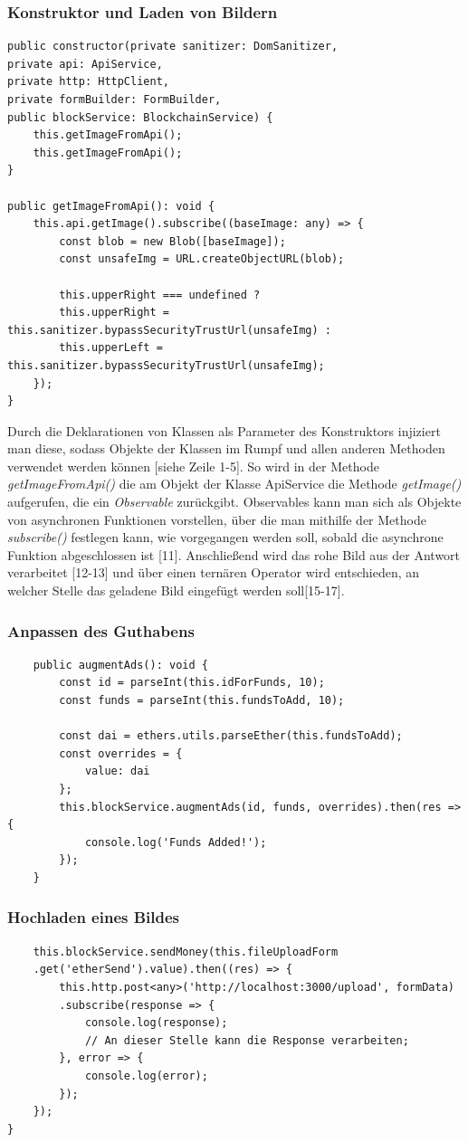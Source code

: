 \subsubsection{Konstruktor und Laden von Bildern}
\begin{lstlisting}
public constructor(private sanitizer: DomSanitizer,
private api: ApiService,
private http: HttpClient,
private formBuilder: FormBuilder,
public blockService: BlockchainService) {
	this.getImageFromApi();
	this.getImageFromApi();
}

public getImageFromApi(): void {
	this.api.getImage().subscribe((baseImage: any) => {
		const blob = new Blob([baseImage]);
		const unsafeImg = URL.createObjectURL(blob);
		
		this.upperRight === undefined ?
		this.upperRight = this.sanitizer.bypassSecurityTrustUrl(unsafeImg) :
		this.upperLeft = this.sanitizer.bypassSecurityTrustUrl(unsafeImg);
	});
}
\end{lstlisting}
Durch die Deklarationen von Klassen als Parameter des Konstruktors injiziert man diese, sodass Objekte der Klassen im Rumpf und allen anderen Methoden verwendet werden können [siehe Zeile 1-5]. So wird in der Methode \emph{getImageFromApi()} die am Objekt der Klasse ApiService die Methode \emph{getImage()} aufgerufen, die ein \emph{Observable} zurückgibt. Observables kann man sich als Objekte von asynchronen Funktionen vorstellen, über die man mithilfe der Methode \emph{subscribe()} festlegen kann, wie vorgegangen werden soll, sobald die asynchrone Funktion abgeschlossen ist [11]. Anschließend wird das rohe Bild aus der Antwort verarbeitet [12-13] und über einen ternären Operator wird entschieden, an welcher Stelle das geladene Bild eingefügt werden soll[15-17].
\subsubsection{Anpassen des Guthabens}
\begin{lstlisting}
	public augmentAds(): void {
		const id = parseInt(this.idForFunds, 10);
		const funds = parseInt(this.fundsToAdd, 10);
		
		const dai = ethers.utils.parseEther(this.fundsToAdd);
		const overrides = {
			value: dai
		};
		this.blockService.augmentAds(id, funds, overrides).then(res => {
			console.log('Funds Added!');
		});
	}
\end{lstlisting}
\subsubsection{Hochladen eines Bildes}
\begin{lstlisting}
	this.blockService.sendMoney(this.fileUploadForm
	.get('etherSend').value).then((res) => {
		this.http.post<any>('http://localhost:3000/upload', formData)
		.subscribe(response => {
			console.log(response);
			// An dieser Stelle kann die Response verarbeiten;
		}, error => {
			console.log(error);
		});
	});
}
\end{lstlisting}
